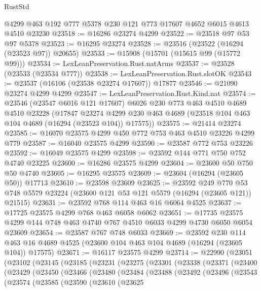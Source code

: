 \begin{lexlean}{RustStd}
\begin{coremodule}
    @4299
    @463
    @192
    @777
    @5378
    @230
    @121
    @773
    @17607
    @4652
    @6015
    @4613
    @4510
    @23230
@23518 := @16286 @23274 @4299
@23522 := @23518 @97 @53 @97 @5378
@23523 := @16295 @23274
@23528 := @23516 (@23522 (@16294 (@23523 @97)) @20655)
@23533 := @15908 (@15701 (@15615 @99 (@15772 @99)))
@23534 := LexLeanPreservation.Rust.natArms
@23537 := @23528 (@23533 (@23534 @777))
@23538 := LexLeanPreservation.Rust.slotOK
@23543 := @23537 (@16106 (@23538 @23274 @17607)) @17877
@23546 := @21090 @23274 @4299 @4299
@23547 := LexLeanPreservation.Rust.Kind.nat
@23574 := @23546
    (@23547 @6016 @121 @17607)
    @6026
    @230
    @773
    @463
    @4510
    @4689
    @4510
    @23228
    (@17847
      @23274
      @4299
      @230
      @463
      @4689
      (@23518 @104 @463 @104 @4689 (@16294 (@23523 @104)) @17575))
@23575 := @21414 @23274
@23585 := @16070 @23575 @4299 @450 @772 @753 @463 @4510 @23226 @4299 @779
@23587 := @16040 @23575 @4299
@23590 := @23587 @772 @753 @23226
@23592 := @16049 @23575 @4299
@23598 := @23592 @144 @771 @750 @752 @4740 @23225
@23600 := @16286 @23575 @4299
@23604 := @23600 @50 @750 @50 @4740
@23605 := @16295 @23575
@23609 := @23604 (@16294 (@23605 @50)) @17713
@23610 := @23598 @23609
@23625 := @23592
    @249
    @770
    @53
    @748
    @5579
    @23224
    (@23600 @121 @53 @121 @5579 (@16294 (@23605 @121)) @21515)
@23631 := @23592 @768 @114 @463 @16 @6064 @4525
@23637 := @17725 @23575 @4299 @768 @463 @6058 @6062
@23651 := @17735 @23575 @4299 @144 @748 @463 @4740 @767 @4510 @6033 @4299 @4730 @6050 @6054 @23609
@23654 := @23587 @767 @748 @6033
@23669 := @23592
    @230
    @114
    @463
    @16
    @4689
    @4525
    (@23600 @104 @463 @104 @4689 (@16294 (@23605 @104)) @17575)
@23671 := @16117 @23575 @4299
@23714 := @22990
    (@23051
      (@23102
        (@23145
          (@23185
            (@23231
              (@23275
                (@23301
                  (@23338
                    (@23371
                      (@23400
                        (@23429
                          (@23450
                            (@23466
                              (@23480
                                (@23484
                                  (@23488
                                    (@23492
                                      (@23496
                                        (@23543
                                          (@23574
                                            (@23585
                                              (@23590
                                                (@23610
                                                  (@23625

\end{coremodule}
\end{lexlean}
